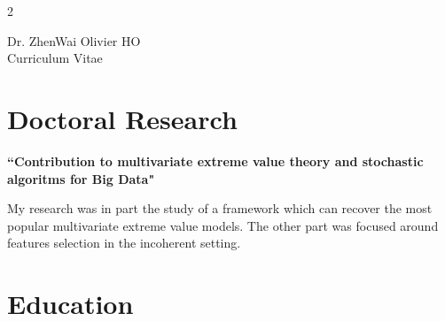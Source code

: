 \documentclass[10pt]{article} %
\begin{document}
\begin{paracol}{2} %


\parbox[top][0.12\textheight][c]{\linewidth}{ %
	\vspace{-0.04\textheight} %
	\centering %
	{\sffamily\Huge Dr. ZhenWai Olivier HO}\\\medskip %
	{\Huge\color{headings}\cvtextfont Curriculum Vitae}
}


\section{Doctoral Research}

{\raggedright\textbf{``Contribution to multivariate extreme value theory and stochastic algoritms for Big Data"}\\\medskip}

My research was in part the study of a framework which can recover the most popular multivariate extreme value models. The other part was focused around features selection in the incoherent setting.

\medskip %



\section{Education} 




\end{paracol}
\end{document}
